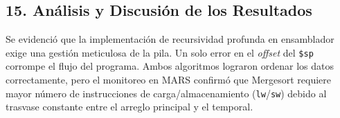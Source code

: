 \documentclass[12pt, a4paper]{article}
\begin{document}
\subsection{15. Análisis y Discusión de los Resultados}
Se evidenció que la implementación de recursividad profunda en ensamblador exige una gestión meticulosa de la pila. Un solo error en el \textit{offset} del \texttt{\$sp} corrompe el flujo del programa. Ambos algoritmos lograron ordenar los datos correctamente, pero el monitoreo en MARS confirmó que Mergesort requiere mayor número de instrucciones de carga/almacenamiento (\texttt{lw}/\texttt{sw}) debido al trasvase constante entre el arreglo principal y el temporal.
\end{document}
